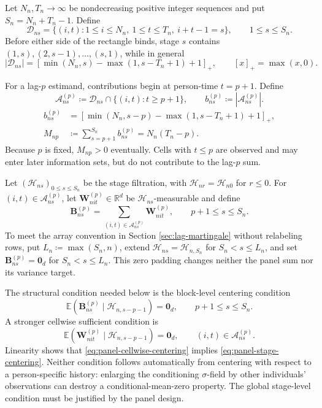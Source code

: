 \documentclass[11pt]{article}
\renewcommand\vec[1]{\boldsymbol{#1}}
\newcommand{\E}{\mathbb{E}}
\newcommand{\R}{\mathbb{R}}
\newcommand{\Hcal}{\mathcal{H}}
\newcommand{\A}{\mathcal{A}}
\theoremstyle{definition}
\begin{document}
Let \(N_n,T_n\to\infty\) be nondecreasing positive integer sequences and put \(S_n=N_n+T_n-1\).
Define
\begin{equation}\label{eq:panel-observation-stage}
\mathcal D_{ns}
=\{(i,t):1\leq i\leq N_n,\ 1\leq t\leq T_n,\ i+t-1=s\},
\qquad 1\leq s\leq S_n.
\end{equation}
Before either side of the rectangle binds, stage \(s\) contains \((1,s),(2,s-1),\ldots,(s,1)\), while in general
\[
|\mathcal D_{ns}|
=
\left[\min(N_n,s)-\max(1,s-T_n+1)+1\right]_+,
\qquad [x]_+=\max(x,0).
\]

For a lag-\(p\) estimand, contributions begin at person-time \(t=p+1\).
Define
\begin{equation}
\A^{(p)}_{ns}
\coloneqq\mathcal D_{ns}\cap\{(i,t):t\geq p+1\},
\qquad
b^{(p)}_{ns}\coloneqq|\A^{(p)}_{ns}|.
\label{eq:panel-contribution-stage}
\end{equation}
\begin{equation}
\begin{aligned}
b^{(p)}_{ns}
&=
\left[\min(N_n,s-p)-\max(1,s-T_n+1)+1\right]_+,\\
M_{np}
&\coloneqq\sum_{s=p+1}^{S_n}b^{(p)}_{ns}
=N_n(T_n-p).
\end{aligned}
\label{eq:panel-block-size}
\end{equation}
Because \(p\) is fixed, \(M_{np}>0\) eventually.
Cells with \(t\leq p\) are observed and may enter later information sets, but do not contribute to the lag-\(p\) sum.

Let \((\Hcal_{ns})_{0\leq s\leq S_n}\) be the stage filtration, with \(\Hcal_{nr}=\Hcal_{n0}\) for \(r\leq0\).
For \((i,t)\in\A^{(p)}_{ns}\), let \(\vec W^{(p)}_{nit}\in\R^d\) be \(\Hcal_{ns}\)-measurable and define
\begin{equation}\label{eq:panel-stage-block}
\vec B^{(p)}_{ns}
=
\sum_{(i,t)\in\A^{(p)}_{ns}}\vec W^{(p)}_{nit},
\qquad p+1\leq s\leq S_n.
\end{equation}
To meet the array convention in Section \ref{sec:lag-martingale} without relabeling rows, put \(L_n\coloneqq\max(S_n,n)\), extend \(\Hcal_{ns}=\Hcal_{n,S_n}\) for \(S_n<s\leq L_n\), and set \(\vec B^{(p)}_{ns}=\vec{0}_d\) for \(S_n<s\leq L_n\).
This zero padding changes neither the panel sum nor its variance target.

The structural condition needed below is the block-level centering condition
\begin{equation}\label{eq:panel-stage-centering}
\E(\vec B^{(p)}_{ns}\mid\Hcal_{n,s-p-1})=\vec{0}_d,
\qquad p+1\leq s\leq S_n.
\end{equation}
A stronger cellwise sufficient condition is
\begin{equation}\label{eq:panel-cellwise-centering}
\E(\vec W^{(p)}_{nit}\mid\Hcal_{n,s-p-1})=\vec{0}_d,
\qquad (i,t)\in\A^{(p)}_{ns}.
\end{equation}
Linearity shows that \eqref{eq:panel-cellwise-centering} implies \eqref{eq:panel-stage-centering}.
Neither condition follows automatically from centering with respect to a person-specific history: enlarging the conditioning \(\sigma\)-field by other individuals' observations can destroy a conditional-mean-zero property.
The global stage-level condition must be justified by the panel design.
\end{document}

